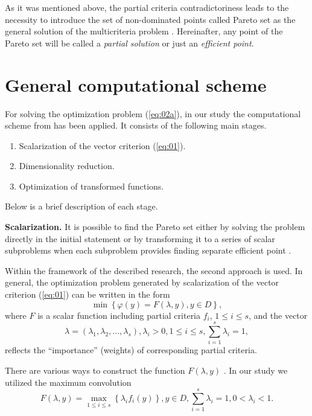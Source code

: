 \documentclass[runningheads]{llncs}
\begin{document}
As it was mentioned above, the partial criteria contradictoriness leads to the necessity to introduce the set of non-dominated points called Pareto set as the general solution of the multicriteria problem \cite{Miettinen1999,Ehrgott2005,Pardalos2017}. Hereinafter, any point of the Pareto set will be called a \textit{partial solution} or just an \textit{efficient point}.


\section{General computational scheme}
\label{sec:3}

For solving the optimization problem (\ref{eq:02a}), in our study the computational scheme from \cite{ML_MCO_2023} has been applied. It consists of the following main stages.
 \begin{enumerate}
	\item Scalarization of the vector criterion (\ref{eq:01}).
	\item Dimensionality reduction.
	\item Optimization of transformed functions.
\end{enumerate}
Below is a brief description of each stage.

\textbf{Scalarization.} It is possible to find the Pareto set either by solving the problem directly in the initial statement \cite{Evtushenko2014,Deb2002,Durillo2010,Mostaghim2007,NDG09,RC05,ZLT01} or by transforming it to a series of scalar subproblems when each subproblem provides finding separate efficient point \cite{Pardalos2017,ML_MCO_2023,Gergel2019_2,Gergel2018,GergelKozinov2020}.

Within the framework of the described research, the second approach is used. In general, the optimization problem generated by scalarization of the vector criterion (\ref{eq:01}) can be written in the form  
\begin{equation}
\label{eq:04}
\min \left\{\varphi(y) = F( \lambda, y ), y \in D\right\},
\end{equation}
where $F$ is a scalar function including partial criteria $f_i$, $1 \leq i \leq s$, and the vector
\begin{equation}
\label{eq:04a}
\lambda = (\lambda_1, \lambda_2, \dots, \lambda_s), \lambda_i > 0, 1 \leq i \leq s, \sum_{i = 1}^s {\lambda_i} = 1,
\end{equation}
reflects the ``importance'' (weights) of corresponding partial criteria. 

There are various ways to construct the function $F(\lambda, y)$ \cite{Miettinen1999,Ehrgott2005,GergelKozinov2020,Marler2004}. In our study we utilized the maximum convolution 
\begin{equation}
\label{eq:05}
F(\lambda, y) = \max_{1 \leq i \leq s} \left\{\lambda_i f_i (y)\right\}, y \in D, \sum_{i=1}^s {\lambda_i} = 1, 0 < \lambda_i < 1.
\end{equation}
\end{document}
